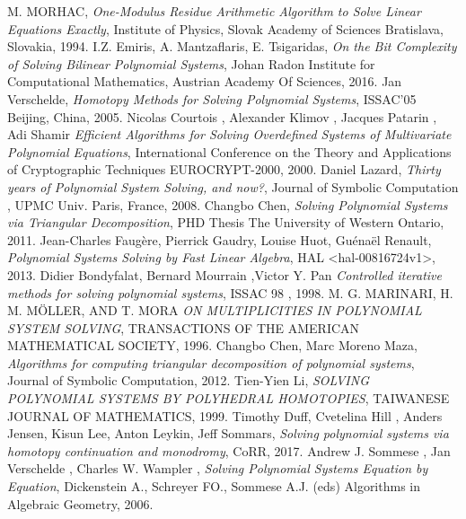 \documentclass[11pt]{article}
\begin{document}
\begin{thebibliography}{1}
   M. MORHAC,
  \textit{One-Modulus Residue Arithmetic Algorithm to Solve Linear Equations Exactly},
   Institute of Physics, Slovak Academy of Sciences
   Bratislava, Slovakia,
   1994.
  I.Z. Emiris, A. Mantzaflaris, E. Tsigaridas,
  \textit{On the Bit Complexity of Solving Bilinear Polynomial Systems},
   Johan Radon Institute for Computational Mathematics,
   Austrian Academy Of Sciences,
   2016.
  Jan Verschelde,
  \textit{Homotopy Methods for Solving Polynomial Systems},
   ISSAC’05
   Beijing, China,
   2005.
  Nicolas Courtois , Alexander Klimov  , Jacques Patarin ,  Adi Shamir
  \textit{Efficient Algorithms for Solving Overdefined Systems of Multivariate Polynomial Equations},
   International Conference on the Theory and Applications of Cryptographic Techniques
   EUROCRYPT-2000,
   2000.
  Daniel Lazard,
  \textit{Thirty years of Polynomial System Solving, and now?},
   Journal of Symbolic Computation ,
   UPMC Univ. Paris, France,
   2008.
  Changbo Chen,
  \textit{Solving Polynomial Systems via Triangular Decomposition},
   PHD Thesis
   The University of Western Ontario,
   2011.
  Jean-Charles Faugère, Pierrick Gaudry, Louise Huot, Guénaël Renault,
  \textit{Polynomial Systems Solving by Fast Linear Algebra},
   HAL <hal-00816724v1>,
   2013.
  Didier Bondyfalat, Bernard Mourrain ,Victor Y. Pan 
  \textit{Controlled iterative methods for solving polynomial systems},
   ISSAC 98 ,
   1998.
  M. G. MARINARI, H. M. MÖLLER, AND T. MORA
  \textit{ON MULTIPLICITIES IN POLYNOMIAL SYSTEM SOLVING},
   TRANSACTIONS OF THE AMERICAN MATHEMATICAL SOCIETY,
   1996.
  Changbo Chen, Marc Moreno Maza,
  \textit{Algorithms for computing triangular decomposition of polynomial systems},
   Journal of Symbolic Computation,
   2012.
  Tien-Yien Li,
  \textit{SOLVING POLYNOMIAL SYSTEMS BY POLYHEDRAL HOMOTOPIES},
   TAIWANESE JOURNAL OF MATHEMATICS,
   1999.
  Timothy Duff, Cvetelina Hill , Anders Jensen, Kisun Lee, Anton Leykin, Jeff Sommars,
  \textit{Solving polynomial systems via homotopy continuation and monodromy},
   CoRR,
   2017.
  Andrew J. Sommese , Jan Verschelde , Charles W. Wampler ,
  \textit{Solving Polynomial Systems Equation by Equation},
   Dickenstein A., Schreyer FO., Sommese A.J. (eds) Algorithms in Algebraic Geometry,
   2006.

\end{thebibliography}
\end{document}
